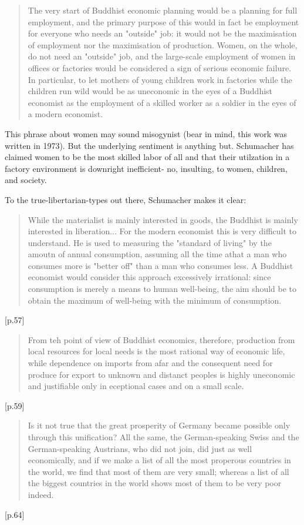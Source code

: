 \begin{quote}
The very start of Buddhist economic planning would be a planning for full employment, and the primary purpose of this would in fact be employment for everyone who needs an "outside" job: it would not be the maximisation of employment nor the maximisation of production. Women, on the whole, do not need an "outside" job, and the large-scale employment of women in offices or factories would be considered a sign of serious economic failure. In particular, to let mothers of young children work in factories while the children run wild would be as uneconomic in the eyes of a Buddhist economist as the employment of a skilled worker as a soldier in the eyes of a modern economist.
\end{quote}

This phrase about women may sound misogynist (bear in mind, this work was written in 1973). But the underlying sentiment is anything but. Schumacher has claimed women to be the most skilled labor of all and that their utilzation in a factory environment is downright inefficient- no, insulting, to women, children, and society.

To the true-libertarian-types out there, Schumacher makes it clear:

\begin{quote}
While the materialist is mainly interested in goods, the Buddhist is mainly interested in liberation... For the modern economist this is very difficult to understand. He is used to measuring the "standard of living" by the amoutn of annual consumption, assuming all the time athat a man who consumes more is "better off" than a man who consumes less. A Buddhist economist would consider this approach excessively irrational: since consumption is merely a means to human well-being, the aim should be to obtain the maximum of well-being with the minimum of consumption.
\end{quote} [p.57]

\begin{quote}
From teh point of view of Buddhist economics, therefore, production from local resources for local needs is the most rational way of economic life, while dependence on imports from afar and the consequent need for produce for export to unknown and distanct peoples is highly uneconomic and justifiable only in eceptional cases and on a small scale.
\end{quote} [p.59]

\begin{quote}
Is it not true that the great prosperity of Germany became possible only through this unification? All the same, the German-speaking Swiss and the German-speaking Austrians, who did not join, did just as well economically, and if we make a list of all the most properous countries in the world, we find that most of them are very small; whereas a list of all the biggest countries in the world shows most of them to be very poor indeed.
\end{quote} [p.64]

